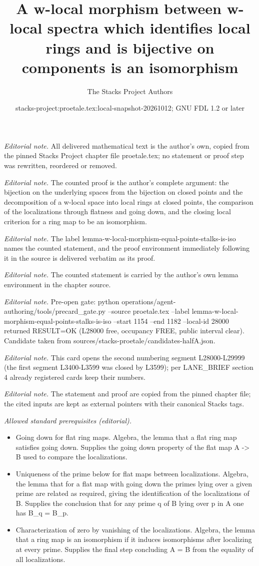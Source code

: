 \documentclass[10pt,a4paper]{amsart}
\title{A w-local morphism between w-local spectra which identifies local rings and is bijective on components is an isomorphism}
\author{The Stacks Project Authors}
\date{stacks-project:proetale.tex:local-snapshot-20261012; GNU FDL 1.2 or later}
\theoremstyle{plain}
\theoremstyle{definition}
\theoremstyle{remark}
\numberwithin{equation}{subsection}
\begin{document}
\maketitle
\noindent\textit{Editorial note.} All delivered mathematical text is the author's own, copied from the pinned Stacks Project chapter file proetale.tex; no statement or proof step was rewritten, reordered or removed.\par\medskip
\noindent\textit{Editorial note.} The counted proof is the author's complete argument: the bijection on the underlying spaces from the bijection on closed points and the decomposition of a w-local space into local rings at closed points, the comparison of the localizations through flatness and going down, and the closing local criterion for a ring map to be an isomorphism.\par\medskip
\noindent\textit{Editorial note.} The label lemma-w-local-morphism-equal-points-stalks-is-iso names the counted statement, and the proof environment immediately following it in the source is delivered verbatim as its proof.\par\medskip
\noindent\textit{Editorial note.} The counted statement is carried by the author's own lemma environment in the chapter source.\par\medskip
\noindent\textit{Editorial note.} Pre-open gate: python operations/agent-authoring/tools/precard\_gate.py --source proetale.tex --label lemma-w-local-morphism-equal-points-stalks-is-iso --start 1154 --end 1182 --local-id 28000 returned RESULT=OK (L28000 free, occupancy FREE, public interval clear). Candidate taken from sources/stacks-proetale/candidates-halfA.json.\par\medskip
\noindent\textit{Editorial note.} This card opens the second numbering segment L28000-L29999 (the first segment L3400-L3599 was closed by L3599); per LANE\_BRIEF section 4 already registered cards keep their numbers.\par\medskip
\noindent\textit{Editorial note.} The statement and proof are copied from the pinned chapter file; the cited inputs are kept as external pointers with their canonical Stacks tags.\par\medskip
\noindent\textit{Allowed standard prerequisites (editorial).}\begin{itemize}
\item Going down for flat ring maps. Algebra, the lemma that a flat ring map satisfies going down. Supplies the going down property of the flat map A -> B used to compare the localizations.
\item Uniqueness of the prime below for flat maps between localizations. Algebra, the lemma that for a flat map with going down the primes lying over a given prime are related as required, giving the identification of the localizations of B. Supplies the conclusion that for any prime q of B lying over p in A one has B\_q = B\_p.
\item Characterization of zero by vanishing of the localizations. Algebra, the lemma that a ring map is an isomorphism if it induces isomorphisms after localizing at every prime. Supplies the final step concluding A = B from the equality of all localizations.
\end{itemize}\medskip
\end{document}

